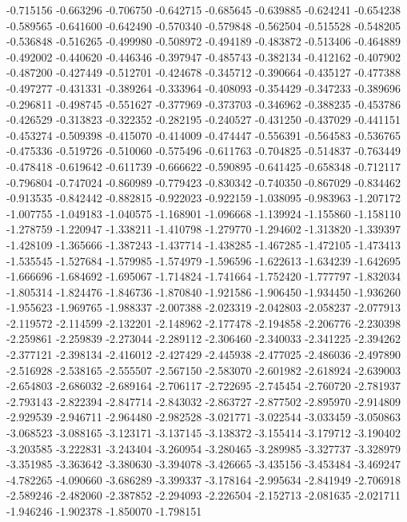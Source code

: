 -0.715156
-0.663296
-0.706750
-0.642715
-0.685645
-0.639885
-0.624241
-0.654238
-0.589565
-0.641600
-0.642490
-0.570340
-0.579848
-0.562504
-0.515528
-0.548205
-0.536848
-0.516265
-0.499980
-0.508972
-0.494189
-0.483872
-0.513406
-0.464889
-0.492002
-0.440620
-0.446346
-0.397947
-0.485743
-0.382134
-0.412162
-0.407902
-0.487200
-0.427449
-0.512701
-0.424678
-0.345712
-0.390664
-0.435127
-0.477388
-0.497277
-0.431331
-0.389264
-0.333964
-0.408093
-0.354429
-0.347233
-0.389696
-0.296811
-0.498745
-0.551627
-0.377969
-0.373703
-0.346962
-0.388235
-0.453786
-0.426529
-0.313823
-0.322352
-0.282195
-0.240527
-0.431250
-0.437029
-0.441151
-0.453274
-0.509398
-0.415070
-0.414009
-0.474447
-0.556391
-0.564583
-0.536765
-0.475336
-0.519726
-0.510060
-0.575496
-0.611763
-0.704825
-0.514837
-0.763449
-0.478418
-0.619642
-0.611739
-0.666622
-0.590895
-0.641425
-0.658348
-0.712117
-0.796804
-0.747024
-0.860989
-0.779423
-0.830342
-0.740350
-0.867029
-0.834462
-0.913535
-0.842442
-0.882815
-0.922023
-0.922159
-1.038095
-0.983963
-1.207172
-1.007755
-1.049183
-1.040575
-1.168901
-1.096668
-1.139924
-1.155860
-1.158110
-1.278759
-1.220947
-1.338211
-1.410798
-1.279770
-1.294602
-1.313820
-1.339397
-1.428109
-1.365666
-1.387243
-1.437714
-1.438285
-1.467285
-1.472105
-1.473413
-1.535545
-1.527684
-1.579985
-1.574979
-1.596596
-1.622613
-1.634239
-1.642695
-1.666696
-1.684692
-1.695067
-1.714824
-1.741664
-1.752420
-1.777797
-1.832034
-1.805314
-1.824476
-1.846736
-1.870840
-1.921586
-1.906450
-1.934450
-1.936260
-1.955623
-1.969765
-1.988337
-2.007388
-2.023319
-2.042803
-2.058237
-2.077913
-2.119572
-2.114599
-2.132201
-2.148962
-2.177478
-2.194858
-2.206776
-2.230398
-2.259861
-2.259839
-2.273044
-2.289112
-2.306460
-2.340033
-2.341225
-2.394262
-2.377121
-2.398134
-2.416012
-2.427429
-2.445938
-2.477025
-2.486036
-2.497890
-2.516928
-2.538165
-2.555507
-2.567150
-2.583070
-2.601982
-2.618924
-2.639003
-2.654803
-2.686032
-2.689164
-2.706117
-2.722695
-2.745454
-2.760720
-2.781937
-2.793143
-2.822394
-2.847714
-2.843032
-2.863727
-2.877502
-2.895970
-2.914809
-2.929539
-2.946711
-2.964480
-2.982528
-3.021771
-3.022544
-3.033459
-3.050863
-3.068523
-3.088165
-3.123171
-3.137145
-3.138372
-3.155414
-3.179712
-3.190402
-3.203585
-3.222831
-3.243404
-3.260954
-3.280465
-3.289985
-3.327737
-3.328979
-3.351985
-3.363642
-3.380630
-3.394078
-3.426665
-3.435156
-3.453484
-3.469247
-4.782265
-4.090660
-3.686289
-3.399337
-3.178164
-2.995634
-2.841949
-2.706918
-2.589246
-2.482060
-2.387852
-2.294093
-2.226504
-2.152713
-2.081635
-2.021711
-1.946246
-1.902378
-1.850070
-1.798151
